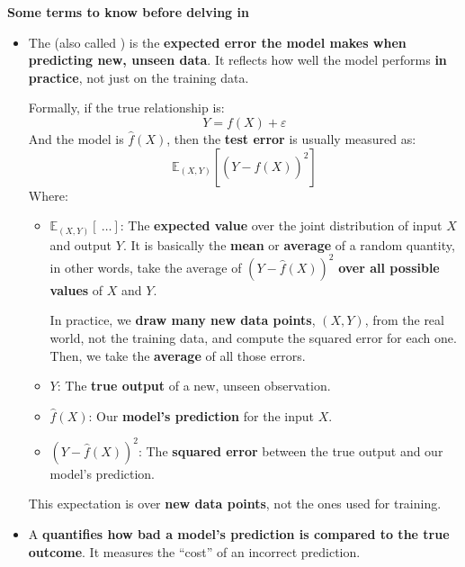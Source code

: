 \highspace
\begin{flushleft}
    \textcolor{Green3}{ \textbf{Some terms to know before delving in}}
\end{flushleft}
\begin{itemize}
    \item The  (also called ) is the \textbf{expected error the model makes when predicting new, unseen data}. It reflects how well the model performs \textbf{in practice}, not just on the training data.
    
    Formally, if the true relationship is:
    \begin{equation*}
        Y = f(X) + \varepsilon
    \end{equation*}
    And the model is $\hat{f}(X)$, then the \textbf{test error} is usually measured as:
    \begin{equation}
        \mathbb{E}_{(X, Y)} \left[ (Y - \hat{f}(X))^2 \right]
    \end{equation}
    Where:
    \begin{itemize}
        \item $\mathbb{E}_{(X, Y)}\left[\: \dots\right]$: The \textbf{expected value} over the joint distribution of input $X$ and output $Y$. It is basically the \textbf{mean} or \textbf{average} of a random quantity, in other words, take the average of $(Y - \hat{f}(X))^2$ \textbf{over all possible values} of $X$ and $Y$.

        In practice, we \textbf{draw many new data points}, $(X, Y)$, from the real world, not the training data, and compute the squared error for each one. Then, we take the \textbf{average} of all those errors.
        \item $Y$: The \textbf{true output} of a new, unseen observation.
        \item $\hat{f}(X)$: Our \textbf{model's prediction} for the input $X$.
        \item $(Y - \hat{f}(X))^2$: The \textbf{squared error} between the true output and our model's prediction.
    \end{itemize}
    This expectation is over \textbf{new data points}, not the ones used for training.

    
    \item \label{def: Loss Function} A  \textbf{quantifies how bad a model's prediction is compared to the true outcome}. It measures the ``cost'' of an incorrect prediction.


\end{itemize}
